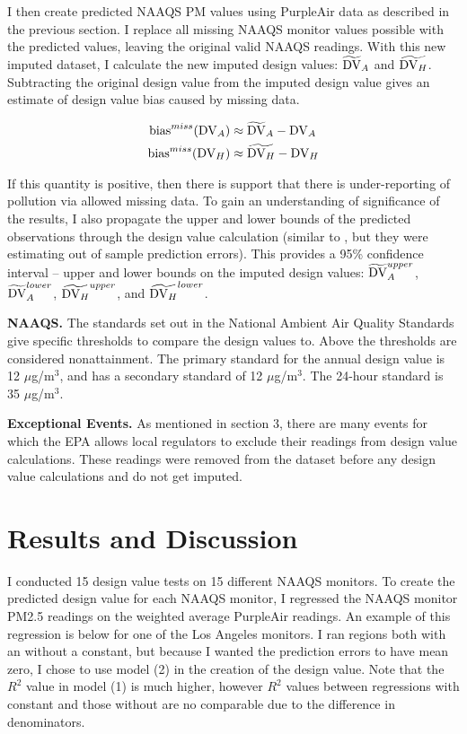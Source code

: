 \documentclass[12pt]{article}
\begin{document}
I then create predicted NAAQS PM values using PurpleAir data as described in the previous section. I replace all missing NAAQS monitor values possible with the predicted values, leaving the original valid NAAQS readings. With this new imputed dataset, I calculate the new imputed design values: $\widetilde{\text{DV}}_A$ and $\widetilde{\text{DV}_H}$. Subtracting the original design value from the imputed design value gives an estimate of design value bias caused by missing data.

\begin{align}
    \text{bias}^{miss}(\text{DV}_A) &\approx \widetilde{\text{DV}}_A - \text{DV}_A\\
    \text{bias}^{miss}(\text{DV}_H) &\approx \widetilde{\text{DV}_H} - \text{DV}_H
\end{align}

If this quantity is positive, then there is support that there is under-reporting of pollution via allowed missing data. To gain an understanding of significance of the results, I also propagate the upper and lower bounds of the predicted observations through the design value calculation (similar to \cite{fowlieBringingSatelliteBasedAir2019}, but they were estimating out of sample prediction errors). This provides a 95\% confidence interval -- upper and lower bounds on the imputed design values: $\widetilde{\text{DV}}_A^{upper}$,  $\widetilde{\text{DV}}_A^{lower}$, $\widetilde{\text{DV}_H}^{upper}$, and $\widetilde{\text{DV}_H}^{lower}$.

\textbf{NAAQS.} The standards set out in the National Ambient Air Quality Standards give specific thresholds to compare the design values to. Above the thresholds are considered nonattainment. The primary standard for the annual design value is 12 $\mu$g/m$^3$, and has a secondary standard of 12 $\mu$g/m$^3$. The 24-hour standard is 35 $\mu$g/m$^3$.


\textbf{Exceptional Events.} As mentioned in section 3, there are many events for which the EPA allows local regulators to exclude their readings from design value calculations. These readings were removed from the dataset before any design value calculations and do not get imputed.









\section{Results and Discussion}
\label{results}
I conducted 15 design value tests on 15 different NAAQS monitors. To create the predicted design value for each NAAQS monitor, I regressed the NAAQS monitor PM2.5 readings on the weighted average PurpleAir readings. An example of this regression is below for one of the Los Angeles monitors. I ran regions both with an without a constant, but because I wanted the prediction errors to have mean zero, I chose to use model (2) in the creation of the design value. Note that the $R^2$ value in model (1) is much higher, however $R^2$ values between regressions with constant and those without are no comparable due to the difference in denominators. 

\end{document}
